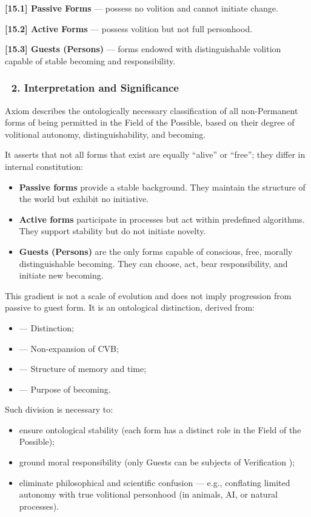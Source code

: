 \documentclass[12pt]{article}
\begin{document}
\textbf{[15.1] Passive Forms} — possess no volition and cannot initiate change.

\textbf{[15.2] Active Forms} — possess volition but not full personhood.

\textbf{[15.3] Guests (Persons)} — forms endowed with distinguishable volition capable of stable becoming and responsibility.

\subsubsection*{🔹 2. Interpretation and Significance}

Axiom \text{[15]} describes the ontologically necessary classification of all non-Permanent forms of being permitted in the Field of the Possible, based on their degree of volitional autonomy, distinguishability, and becoming.

It asserts that not all forms that exist are equally ``alive'' or ``free''; they differ in internal constitution:

\begin{itemize}
\item \textbf{Passive forms} provide a stable background. They maintain the structure of the world but exhibit no initiative.
\item \textbf{Active forms} participate in processes but act within predefined algorithms. They support stability but do not initiate novelty.
\item \textbf{Guests (Persons)} are the only forms capable of conscious, free, morally distinguishable becoming. They can choose, act, bear responsibility, and initiate new becoming.
\end{itemize}

This gradient is not a scale of evolution and does not imply progression from passive to guest form. It is an ontological distinction, derived from:

\begin{itemize}
\item \text{[9]} — Distinction;
\item \text{[13]} — Non-expansion of CVB;
\item \text{[10.3.7–10.3.8]} — Structure of memory and time;
\item \text{[28]} — Purpose of becoming.
\end{itemize}

Such division is necessary to:

\begin{itemize}
\item ensure ontological stability (each form has a distinct role in the Field of the Possible);
\item ground moral responsibility (only Guests can be subjects of Verification \text{[Judgment]});
\item eliminate philosophical and scientific confusion — e.g., conflating limited autonomy with true volitional personhood (in animals, AI, or natural processes).
\end{itemize}
\end{document}
